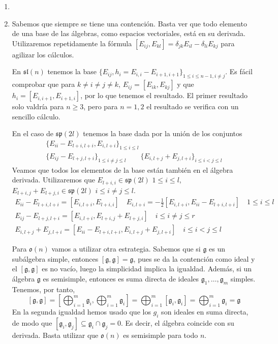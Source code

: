 \documentclass[twoside]{article}
\begin{document}
\begin{solucion}
\begin{enumerate}
\item[]
\item Sabemos que siempre se tiene una contención. Basta ver que todo elemento de una base de las álgebras, como espacios vectoriales, está en su derivada. Utilizaremos repetidamente la fórmula $[E_{ij},E_{kl}]=\delta_{jk}E_{il}-\delta_{li}E_{kj}$ para agilizar los cálculos.

En $\mathfrak{sl}(n)$ tenemos la base $\{E_{ij}, h_i=E_{i,i}-E_{i+1,i+1}\}_{1\leq i\leq n-1, i\neq j}$. Es fácil comprobar que para $k\neq i\neq j\neq k$, $E_{ij}=[E_{ik},E_{kj}]$ y que $h_i=[E_{i,i+1},E_{i+1,i}]$, por lo que tenemos el resultado. El primer resultado solo valdría para $n\geq 3$, pero para $n=1,2$ el resultado se verifica con un sencillo cálculo.

En el caso de $\mathfrak{sp}(2l)$ tenemos la base dada por la unión de los conjuntos
\begin{gather*}
\{E_{ii}-E_{l+i,l+i}, E_{i,l+i}\}_{1\leq i \leq l} \\
\{E_{ij}-E_{l+j,l+i}\}_{1\leq i\neq j\leq l} \qquad \{E_{i,l+j}+E_{j,l+i}\}_{i\leq i<j\leq l}
\end{gather*}
Veamos que todos los elementos de la base están también en el álgebra derivada. Utilizaremos que $E_{l+i,i} \in \mathfrak{sp}(2l)$ $1\leq i \leq l$, $E_{l+i,j}+E_{l+j,i} \in \mathfrak{sp}(2l)$ $i \leq i\neq j \leq l$.
\begin{gather*}
E_{ii}-E_{l+i,l+i}=[E_{i,l+i},E_{l+i,i}] \quad E_{i,l+i} = -\frac{1}{2}[E_{i,l+i},E_{ii}-E_{l+i,l+i}] \quad 1\leq i \leq l\\
E_{ij}-E_{l+j,l+i}=[E_{i,l+i},E_{l+i,j}+E_{l+j,i}] \quad i \leq i \neq j \leq r\\
E_{i,l+j}+E_{j,l+i}=[E_{ii}-E_{l+i,l+i},E_{i,l+j}+E_{j,l+i}]\quad i \leq i < j \leq l
\end{gather*}

Para $\mathfrak{o}(n)$ vamos a utilizar otra estrategia. Sabemos que si $\mathfrak{g}$ es un subálgebra simple, entonces $[\mathfrak{g},\mathfrak{g}] = \mathfrak{g}$, pues se da la contención como ideal y el $[\mathfrak{g},\mathfrak{g}]$ es no vacío, luego la simplicidad implica la igualdad.  Además, si un álgebra $\mathfrak{g}$ es semisimple, entonces es suma directa de ideales $\mathfrak{g}_1,\dotsc,\mathfrak{g}_m$ simples. Tenemos, por tanto,
$$
[\mathfrak{g},\mathfrak{g}] = \left[\bigoplus_{i=1}^m \mathfrak{g}_i,\bigoplus_{i=1}^m \mathfrak{g}_i\right] = \bigoplus_{i=1}^m [\mathfrak{g}_i,\mathfrak{g}_i] =\bigoplus_{i=1}^m \mathfrak{g}_i = \mathfrak{g}
$$
En la segunda igualdad hemos usado que los $g_i$ son ideales en suma directa, de modo que $[\mathfrak{g}_i,\mathfrak{g}_j]\subseteq \mathfrak{g}_i\cap\mathfrak{g}_j=0$. Es decir, el álgebra coincide con su derivada. Basta utilizar que $\mathfrak{o}(n)$ es semisimple  para todo $n$.


\end{enumerate}
\end{solucion}
\end{document}
